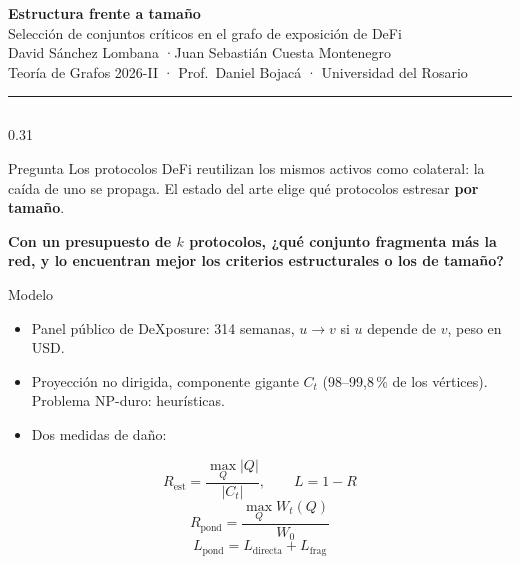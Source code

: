 \documentclass[final]{beamer}
\newcommand{\clave}[1]{{\color{acento}\bfseries #1}}
\begin{document}
\begin{frame}[t]

\begin{center}
{\fontsize{120}{140}\selectfont\bfseries Estructura frente a tamaño}\\[1ex]
{\fontsize{64}{76}\selectfont Selección de conjuntos críticos en el grafo de exposición de DeFi}\\[1.2ex]
{\Large David Sánchez Lombana \quad·\quad Juan Sebastián Cuesta Montenegro}\\[0.4ex]
{\large\color{suave} Teoría de Grafos 2026-II · Prof.\ Daniel Bojacá · Universidad del Rosario}
\end{center}
\vspace{1ex}
{\color{acento}\rule{\linewidth}{4pt}}
\vspace{1ex}

\begin{columns}[t,totalwidth=\linewidth]

\begin{column}{0.31\linewidth}

\begin{block}{Pregunta}
Los protocolos DeFi reutilizan los mismos activos como colateral: la caída de
uno se propaga. El estado del arte elige qué protocolos estresar \clave{por
tamaño}.

\vspace{0.5ex}
\textbf{Con un presupuesto de $k$ protocolos, ¿qué conjunto fragmenta más la
red, y lo encuentran mejor los criterios estructurales o los de tamaño?}
\end{block}

\begin{block}{Modelo}
\begin{itemize}
\item Panel público de DeXposure: 314 semanas, $u\to v$ si $u$ depende de $v$,
      peso en USD.
\item Proyección no dirigida, componente gigante $C_t$ (98--99{,}8\,\% de los
      vértices). Problema NP-duro: heurísticas.
\item Dos medidas de daño:
\end{itemize}
\[
R_{\mathrm{est}}=\frac{\max_Q|Q|}{|C_t|},\qquad L=1-R
\]
\[
R_{\mathrm{pond}}=\frac{\max_Q W_t(Q)}{W_0}
\]
\[
L_{\mathrm{pond}}=L_{\mathrm{directa}}+L_{\mathrm{frag}}
\]
\end{block}


\end{column}
\end{columns}
\end{frame}
\end{document}
